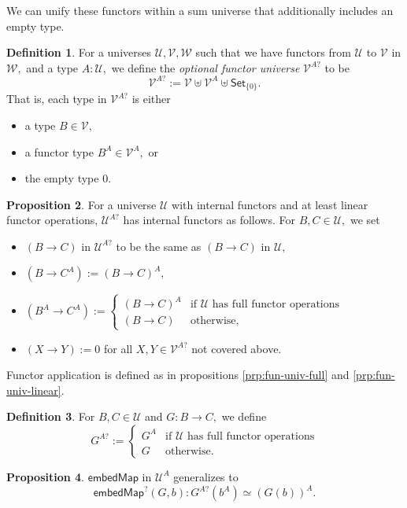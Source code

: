 \documentclass[a4paper]{article}
\theoremstyle{definition}
\newtheorem{definition}{Definition}[section]
\newtheorem{proposition}[definition]{Proposition}
\theoremstyle{remark}
\newcommand{\defn}{\emph}
\renewcommand{\equiv}{\simeq}
\newcommand{\U}{\mathcal{U}}
\newcommand{\V}{\mathcal{V}}
\newcommand{\W}{\mathcal{W}}
\newcommand{\nm}{\mathsf}
\newcommand{\universe}{\nm}
\newcommand{\Set}{\universe{Set}}
\begin{document}
We can unify these functors within a sum universe that additionally includes an
empty type.

\begin{definition}
  For a universes $\U,\V,\W$ such that we have functors from $\U$ to $\V$ in $\W,$
  and a type $A : \U,$ we define the \defn{optional functor universe} $\V^{A?}$ to
  be
  \[\V^{A?} := \V \uplus \V^A \uplus \Set_{\{0\}}.\]
  That is, each type in $\V^{A?}$ is either
  \begin{itemize}
    \item a type $B \in \V,$
    \item a functor type $B^A \in \V^A,$ or
    \item the empty type $0.$
  \end{itemize}
\end{definition}

\begin{proposition}
  For a universe $\U$ with internal functors and at least linear functor operations,
  $\U^{A?}$ has internal functors as follows. For $B,C \in \U,$ we set
  \begin{itemize}
    \item $(B \to C)$ in $\U^{A?}$ to be the same as $(B \to C)$ in $\U,$
    \item $(B \to C^A) := (B \to C)^A,$
    \item $(B^A \to C^A) := \begin{cases}
      (B \to C)^A & \text{if $\U$ has full functor operations}\\
      (B \to C)   & \text{otherwise,}
    \end{cases}$
    \item $(X \to Y) := 0$ for all $X,Y \in \V^{A?}$ not covered above.
  \end{itemize}
  Functor application is defined as in propositions \ref{prp:fun-univ-full} and
  \ref{prp:fun-univ-linear}.
\end{proposition}

\begin{definition}
  For $B,C \in \U$ and $G : B \to C,$ we define
  \[G^{A?} := \begin{cases}
    G^A & \text{if $\U$ has full functor operations}\\
    G   & \text{otherwise.}
  \end{cases}\]
\end{definition}

\begin{proposition}
  $\nm{embedMap}$ in $\U^A$ generalizes to
  \[\nm{embedMap}^?(G,b) : G^{A?}(b^A) \equiv (G(b))^A.\]
\end{proposition}
\end{document}
